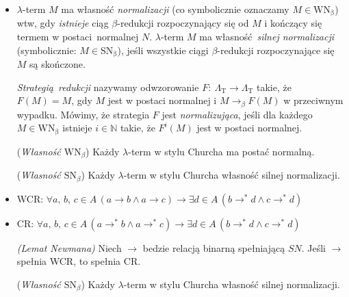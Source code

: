   \begin{itemize}
\item 
  \(\lambda\)-term \(M\) ma własność \emph{normalizacji} (co symbolicznie oznaczamy \(M\in\mathrm{WN_{\beta}}\)) wtw, gdy \emph{istnieje} ciąg \(\beta\)-redukcji rozpoczynający się od \(M\) i kończący się termem w postaci normalnej \(N\). \(\lambda\)-term \(M\) ma własność \emph{silnej normalizacji} (symbolicznie: \(M\in\mathrm{SN_{\beta}}\)), jeśli wszystkie ciągi \(\beta\)-redukcji rozpoczynające się \(M\) są skończone.

  \emph{Strategią redukcji} nazywamy odwzorowanie \(F:\:\Lambda_{\mathrm{T}}\to\Lambda_{\mathrm{T}}\) takie, że \(F(M)=M\), gdy \(M\) jest w postaci normalnej i \(M\to_{\beta}F(M)\) w przeciwnym wypadku. Mówimy, że strategia \(F\) jest \emph{normalizująca}, jeśli dla każdego \(M\in \mathrm{WN_\beta}\) istnieje \(i\in\mathbb{N}\) takie, że \(F^i (M)\) jest w postaci normalnej.

\begin{twierdzenie} 
  (\emph{Własność \(\mathrm{WN}_{\beta}\)}) Każdy \(\lambda\)-term w stylu Churcha ma postać normalną.
\end{twierdzenie}

\begin{twierdzenie} 
  (\emph{Własność \(\mathrm{SN}_{\beta}\)}) Każdy \(\lambda\)-term w stylu Churcha własność silnej normalizacji.
\end{twierdzenie}

\item WCR: \(\forall a,\,b,\,c\in A\, (a\longrightarrow b \land a\longrightarrow c)\to \exists d\in A\,(b\longrightarrow^{*} d \land c\longrightarrow^{*} d)\)
\item CR: \(\forall a,\,b,\,c\in A\, (a\longrightarrow^{*} b \land a\longrightarrow^{*}c)\to \exists d\in A\,(b\longrightarrow^{*} d \land c\longrightarrow^{*} d)\)

\begin{twierdzenie} 
  \emph{(Lemat Newmana)} Niech \(\to\) bedzie relacją binarną spełniającą \(SN\). Jeśli \(\to\) spełnia WCR, to spełnia CR.
\end{twierdzenie}

\begin{twierdzenie} 
  (\emph{Własność \(\mathrm{SN}_{\beta}\)}) Każdy \(\lambda\)-term w stylu Churcha własność silnej normalizacji.
\end{twierdzenie}

\end{itemize}
